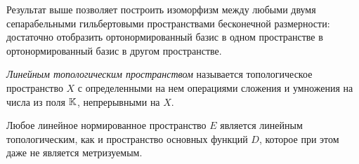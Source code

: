 \begin{note}
	Результат выше позволяет построить изоморфизм между любыми двумя сепарабельными гильбертовыми пространствами бесконечной размерности: достаточно отобразить ортонормированный базис в одном пространстве в ортонормированный базис в другом пространстве.
\end{note}

\begin{definition}
	\textit{Линейным топологическим пространством} называется топологическое пространство $X$ с определенными на нем операциями сложения и умножения на числа из поля $\mathbb{K}$, непрерывными на $X$.
\end{definition}

\begin{example}
	Любое линейное нормированное пространство $E$ является линейным топологическим, как и пространство основных функций $D$, которое при этом даже не является метризуемым.
\end{example}